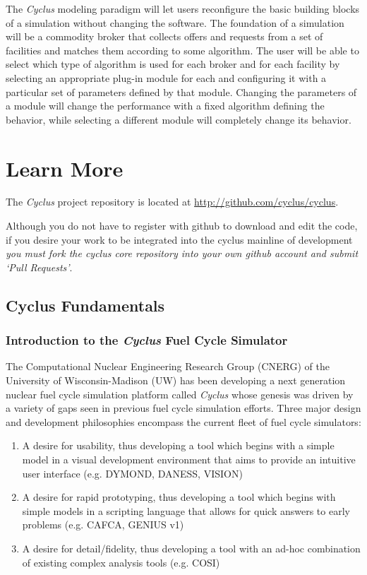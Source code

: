 \documentclass[letterpaper,10pt,english]{sphinxmanual}
\begin{document}
The \emph{Cyclus} modeling paradigm will let users reconﬁgure the basic
building blocks of a simulation without changing the software. The
foundation of a simulation will be a commodity broker that collects
offers and requests from a set of facilities and matches them
according to some algorithm. The user will be able to select which
type of algorithm is used for each broker and for each facility by
selecting an appropriate plug-in module for each and configuring it
with a particular set of parameters defined by that module. Changing
the parameters of a module will change the performance with a fixed
algorithm defining the behavior, while selecting a different module
will completely change its behavior.


\chapter{Learn More}
\label{index:learn-more}
The \emph{Cyclus} project repository is located at
\href{http://github.com/cyclus/cyclus}{http://github.com/cyclus/cyclus}.

Although you do not have to register with github to
download and edit the code, if you desire your work to be integrated into the
cyclus mainline of development \emph{you must fork the cyclus core repository into
your own github account and submit `Pull Requests'}.


\section{Cyclus Fundamentals}
\label{basics/main::doc}\label{basics/main:cyclus-fundamentals}

\subsection{Introduction to the \emph{Cyclus} Fuel Cycle Simulator}
\label{basics/introduction:introduction-to-the-cyclus-fuel-cycle-simulator}\label{basics/introduction::doc}
The Computational Nuclear Engineering Research Group (CNERG) of the University
of  Wisconsin-Madison (UW) has been developing a next generation nuclear fuel
cycle simulation platform called \emph{Cyclus} whose genesis was driven by a variety
of gaps seen in previous fuel cycle simulation efforts.  Three major design and
development philosophies encompass the current fleet of fuel cycle simulators:
\begin{enumerate}
\item {} 
A desire for usability, thus developing a tool which begins with a simple
model in a visual development environment that aims to provide an intuitive
user interface (e.g. DYMOND, DANESS, VISION)

\item {} 
A desire for rapid prototyping, thus developing a tool which begins with
simple models in a scripting language that allows for quick answers to early
problems (e.g.  CAFCA, GENIUS v1)

\item {} 
A desire for detail/fidelity, thus developing a tool with an ad-hoc
combination of existing complex analysis tools (e.g. COSI)

\end{enumerate}
\end{document}
